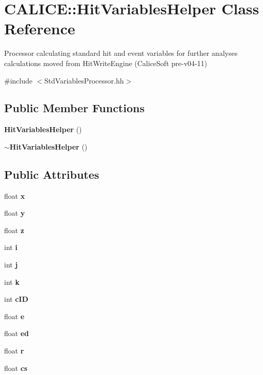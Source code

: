 \section{C\-A\-L\-I\-C\-E\-:\-:Hit\-Variables\-Helper Class Reference}
\label{classCALICE_1_1HitVariablesHelper}


Processor calculating standard hit and event variables for further analyses calculations moved from Hit\-Write\-Engine (Calice\-Soft pre-\/v04-\/11)  




{\ttfamily \#include $<$Std\-Variables\-Processor.\-hh$>$}

\subsection*{Public Member Functions}
\begin{DoxyCompactItemize}
\item 
{\bf Hit\-Variables\-Helper} ()
\item 
{\bf $\sim$\-Hit\-Variables\-Helper} ()
\end{DoxyCompactItemize}
\subsection*{Public Attributes}
\begin{DoxyCompactItemize}
\item 
float {\bfseries x}\label{classCALICE_1_1HitVariablesHelper_a6d375969199a84e30917469315e585a9}

\item 
float {\bf y}
\item 
float {\bf z}
\item 
int {\bf i}
\item 
int {\bfseries j}\label{classCALICE_1_1HitVariablesHelper_aa290ca63af8d3140cc425383f383a221}

\item 
int {\bfseries k}\label{classCALICE_1_1HitVariablesHelper_afedeacea49144baff56b9bfcc294022e}

\item 
int {\bfseries c\-I\-D}\label{classCALICE_1_1HitVariablesHelper_a85f57e27d168684bd13471018bbb2ee7}

\item 
float {\bfseries e}\label{classCALICE_1_1HitVariablesHelper_ad9ee120ca5effc4a4a71189ee0aa9393}

\item 
float {\bf ed}
\item 
float {\bfseries r}\label{classCALICE_1_1HitVariablesHelper_ac2affc43df0ec987a13e06994e8bef64}

\item 
float {\bfseries cs}\label{classCALICE_1_1HitVariablesHelper_adddc573d1d20fcd96a3ef975b06271de}

\end{DoxyCompactItemize}


